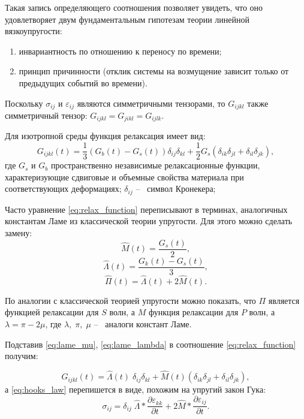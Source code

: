 \documentclass[a4paper, fontsize=14pt]{article}
\begin{document}
Такая запись определяющего соотношения позволяет увидеть, что оно удовлетворяет двум фундаментальным гипотезам теории линейной вязкоупругости:
\begin{enumerate}
    \item инвариантность по отношению к переносу по времени;
    \item принцип причинности (отклик системы на возмущение зависит только от предыдущих событий во времени).
\end{enumerate}

Поскольку $\sigma_{ij}$ и $\varepsilon_{ij}$ являются симметричными тензорами, то $G_{ijkl}$ также симметричный тензор: $G_{ijkl} = G_{jikl} = G_{ijlk}$.


Для изотропной среды функция релаксация имеет вид:
\begin{equation}
    \label{eq:relax_function}
    G_{ijkl} (t) = \frac{1}{3} \left( G_{b}(t) - G_{s}(t) \right) \delta_{ij} \delta_{kl} + \frac{1}{2} G_s \left( \delta_{ik} \delta_{jl} + \delta_{il} \delta_{jk}\right), 
\end{equation}
где $G_s$ и $G_b$ пространственно независимые релаксационные функции, характеризующие сдвиговые и объемные свойства материала при соответствующих деформациях; 
$\delta_{ij}$ --~  символ Кронекера;

Часто уравнение \eqref{eq:relax_function} переписывают в терминах, аналогичных константам Ламе из классической теории упругости. Для этого можно сделать замену:
\begin{equation}
    \label{eq:lame_mu}
    \hat{M}(t) = \frac{G_s(t)}{2},
\end{equation}
\begin{equation}
    \label{eq:lame_lambda}
    \hat{\Lambda}(t) = \frac{G_k(t) - G_s(t)}{3},
\end{equation}
\begin{equation}
    \label{eq:lame_pi}
    \hat{\Pi}(t) = \hat{\Lambda}(t) + 2 \hat{M}(t) .
\end{equation}

По аналогии с классической теорией упругости можно показать, что $\Pi$ является функцией релаксации для $S$ волн, а $M$ функция релаксации для $P$ волн, а
$\lambda = \pi - 2\mu$, где $\lambda, \; \pi, \; \mu$ --~ аналоги констант Ламе. 

Подставив \eqref{eq:lame_mu}, \eqref{eq:lame_lambda} в соотношение \eqref{eq:relax_function} получим:

\begin{equation}
    \label{eq:relax_tensor_lame}
    G_{ijkl}(t) = \hat{\Lambda}(t) \; \delta_{ij} \delta_{kl} + \hat{M}(t) \left( \delta_{ik} \delta_{jl} + \delta_{il} \delta_{jk}\right),
\end{equation}
а \eqref{eq:hooks_law} перепишется в виде, похожим на упругий закон Гука:
\begin{equation}
    \label{eq:hooks_law_lame}
    \sigma_{ij} = \delta_{ij} \;  \hat{\Lambda} \ast \frac{\partial \varepsilon_{kk}}{\partial t} + 2 \hat{M} \ast \frac{\partial \varepsilon_{ij}}{\partial t}.
\end{equation}
\end{document}
